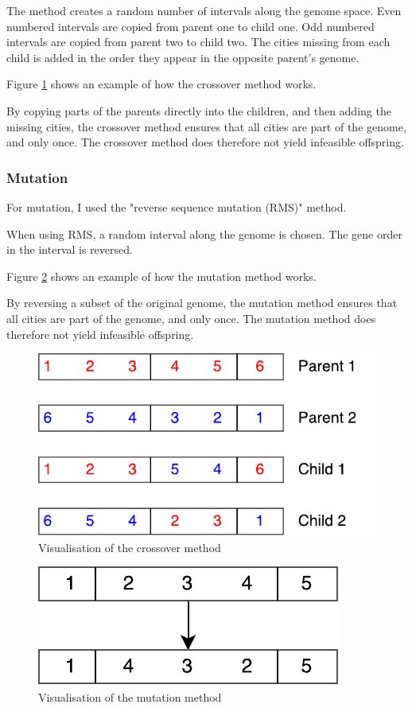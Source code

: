 \documentclass[
]{article}
\begin{document}
The method creates a random number of intervals along the genome space. Even numbered intervals are copied from parent one to child one. Odd numbered intervals are copied from parent two to child two. The cities missing from each child is added in the order they appear in the opposite parent's genome.

Figure \ref{fig:crossover} shows an example of how the crossover method works.

By copying parts of the parents directly into the children, and then adding the missing cities, the crossover method ensures that all cities are part of the genome, and only once. The crossover method does therefore not yield infeasible offspring.

\begin{figure}
\end{figure}

\subsubsection{Mutation}
For mutation, I used the "reverse sequence mutation (RMS)" method.

When using RMS, a random interval along the genome is chosen. The gene order in the interval is reversed.

Figure \ref{fig:mutation} shows an example of how the mutation method works.

By reversing a subset of the original genome, the mutation method ensures that all cities are part of the genome, and only once. The mutation method does therefore not yield infeasible offspring.

\begin{figure}[H]
    \centering
    \includegraphics[width=.5\linewidth]{crossover.pdf}
    \caption{Visualisation of the crossover method}
    \label{fig:crossover}
\end{figure}
\begin{figure}[H]
    \centering
    \includegraphics[width=.5\linewidth]{mutation.pdf}
    \caption{Visualisation of the mutation method}
    \label{fig:mutation}
\end{figure}
\end{document}

